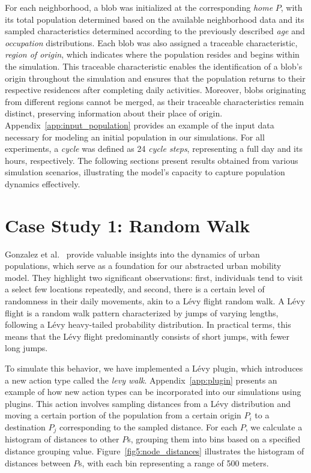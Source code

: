 For each neighborhood, a blob was initialized at the corresponding \textit{home} $P$, with its total population determined based on the available neighborhood data and its sampled characteristics determined according to the previously described \textit{age} and \textit{occupation} distributions.
Each blob was also assigned a traceable characteristic, \textit{region of origin}, which indicates where the population resides and begins within the simulation. This traceable characteristic enables the identification of a blob's origin throughout the simulation and ensures that the population returns to their respective residences after completing daily activities. Moreover, blobs originating from different regions cannot be merged, as their traceable characteristics remain distinct, preserving information about their place of origin.
Appendix~\ref{app:input_population} provides an example of the input data necessary for modeling an initial population in our simulations.
For all experiments, a \textit{cycle} was defined as 24 \textit{cycle steps}, representing a full day and its hours, respectively. The following sections present results obtained from various simulation scenarios, illustrating the model's capacity to capture population dynamics effectively.


\section{Case Study 1: Random Walk}
\label{sec:random_walk}

Gonzalez et al.~\cite{gonzalez2008understanding} provide valuable insights into the dynamics of urban populations, which serve as a foundation for our abstracted urban mobility model. They highlight two significant observations: first, individuals tend to visit a select few locations repeatedly, and second, there is a certain level of randomness in their daily movements, akin to a Lévy flight random walk.
A Lévy flight is a random walk pattern characterized by jumps of varying lengths, following a Lévy heavy-tailed probability distribution. In practical terms, this means that the Lévy flight predominantly consists of short jumps, with fewer long jumps.

To simulate this behavior, we have implemented a Lévy plugin, which introduces a new action type called the \textit{levy walk}. Appendix~\ref{app:plugin} presents an example of how new action types can be incorporated into our simulations using plugins. This action involves sampling distances from a Lévy distribution and moving a certain portion of the population from a certain origin $P_i$ to a destination $P_j$ corresponding to the sampled distance.
For each $P$, we calculate a histogram of distances to other $P$s, grouping them into bins based on a specified distance grouping value. Figure~\ref{fig5:node_distances} illustrates the histogram of distances between $P$s, with each bin representing a range of 500 meters.

